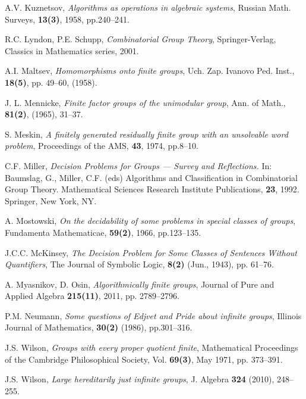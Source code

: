 \documentclass[12pt,a4paper]{amsart}
\begin{document}
\begin{thebibliography}{}
A.V. Kuznetsov, \emph{Algorithms as operations in algebraic systems}, Russian Math. Surveys, \textbf{13(3)}, 1958, pp.240--241.

R.C. Lyndon, P.E. Schupp, \emph{Combinatorial Group Theory}, Springer-Verlag, Classics in Mathematics series, 2001.

A.I. Maltsev, \emph{Homomorphisms onto finite groups}, Uch. Zap. Ivanovo Ped. Inst., \textbf{18(5)}, pp. 49--60, (1958).

J. L. Mennicke, \emph{Finite factor groups of the unimodular group}, Ann. of Math., \textbf{81(2)}, (1965), 31--37.

S. Meskin, \emph{A finitely generated residually finite group with an unsolvable word problem}, Proceedings of the AMS, \textbf{43}, 1974, pp.8--10.

C.F. Miller, \emph{Decision Problems for Groups — Survey and Reflections.} In: Baumslag, G., Miller, C.F. (eds) Algorithms and Classification in Combinatorial Group Theory. Mathematical Sciences Research Institute Publications, \textbf{23}, 1992. Springer, New York, NY.

A. Mostowski, \emph{On the decidability of some problems in special classes of groups}, Fundamenta Mathematicae, \textbf{59(2)}, 1966, pp.123--135.

J.C.C. McKinsey, \emph{The Decision Problem for Some Classes of Sentences Without Quantifiers}, The Journal of Symbolic Logic, \textbf{8(2)} (Jun., 1943), pp. 61--76.

A. Myasnikov, D. Osin, \emph{Algorithmically finite groups}, Journal of Pure and Applied Algebra
\textbf{215(11)}, 2011, pp. 2789--2796.

P.M. Neumann, \emph{Some questions of Edjvet and Pride about infinite groups}, Illinois Journal of Mathematics, \textbf{30(2)} (1986), pp.301--316.


J.S. Wilson, \emph{Groups with every proper quotient finite},
Mathematical Proceedings of the Cambridge Philosophical Society, Vol. \textbf{69(3)}, May 1971, pp. 373--391.

J.S. Wilson, \emph{Large hereditarily just infinite groups}, J. Algebra \textbf{324} (2010), 248--255.

\end{thebibliography}
\end{document}
